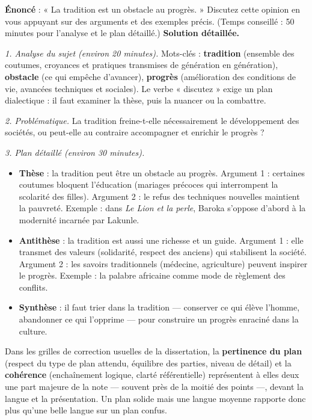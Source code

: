 \documentclass[11pt]{article}
\newcounter{popsec}
\newcounter{popsub}
\newcommand{\courssub}[1]{%
  \stepcounter{popsub}%
  \par\vspace{9pt}\noindent{\popxbold\fontsize{11.5}{13}\selectfont\color{popink}{\color{poporange}\thepopsec.\thepopsub}\hspace{6pt}#1}\par\nopagebreak\vspace{4pt}
}
\begin{document}
\begin{exoresolu}
\textbf{Énoncé} : « La tradition est un obstacle au progrès. » Discutez cette opinion en vous appuyant sur des arguments et des exemples précis. (Temps conseillé : 50 minutes pour l'analyse et le plan détaillé.)
\tcblower
\textbf{Solution détaillée.}

\emph{1. Analyse du sujet (environ 20 minutes).} Mots-clés : \textbf{tradition} (ensemble des coutumes, croyances et pratiques transmises de génération en génération), \textbf{obstacle} (ce qui empêche d'avancer), \textbf{progrès} (amélioration des conditions de vie, avancées techniques et sociales). Le verbe « discutez » exige un plan dialectique : il faut examiner la thèse, puis la nuancer ou la combattre.

\emph{2. Problématique.} La tradition freine-t-elle nécessairement le développement des sociétés, ou peut-elle au contraire accompagner et enrichir le progrès ?

\emph{3. Plan détaillé (environ 30 minutes).}
\begin{itemize}
\item \textbf{Thèse} : la tradition peut être un obstacle au progrès. Argument 1 : certaines coutumes bloquent l'éducation (mariages précoces qui interrompent la scolarité des filles). Argument 2 : le refus des techniques nouvelles maintient la pauvreté. Exemple : dans \emph{Le Lion et la perle}, Baroka s'oppose d'abord à la modernité incarnée par Lakunle.
\item \textbf{Antithèse} : la tradition est aussi une richesse et un guide. Argument 1 : elle transmet des valeurs (solidarité, respect des anciens) qui stabilisent la société. Argument 2 : les savoirs traditionnels (médecine, agriculture) peuvent inspirer le progrès. Exemple : la palabre africaine comme mode de règlement des conflits.
\item \textbf{Synthèse} : il faut trier dans la tradition — conserver ce qui élève l'homme, abandonner ce qui l'opprime — pour construire un progrès enraciné dans la culture.
\end{itemize}
\end{exoresolu}

\courssub{Gérer son temps le jour de l'épreuve}

\begin{exemplebox}
Dans les grilles de correction usuelles de la dissertation, la \textbf{pertinence du plan} (respect du type de plan attendu, équilibre des parties, niveau de détail) et la \textbf{cohérence} (enchaînement logique, clarté référentielle) représentent à elles deux une part majeure de la note — souvent près de la moitié des points —, devant la langue et la présentation. Un plan solide mais une langue moyenne rapporte donc plus qu'une belle langue sur un plan confus.
\end{exemplebox}
\end{document}
